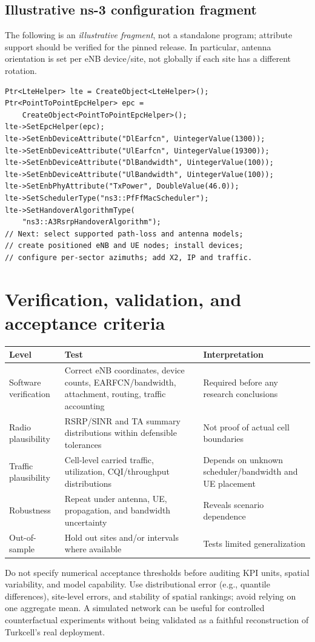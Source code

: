 \documentclass[11pt,a4paper]{article}
\begin{document}
\subsection{Illustrative ns-3 configuration fragment}
The following is an \emph{illustrative fragment}, not a standalone program; attribute support should be verified for the pinned release. In particular, antenna orientation is set per eNB device/site, not globally if each site has a different rotation.
\begin{lstlisting}[style=cpp]
Ptr<LteHelper> lte = CreateObject<LteHelper>();
Ptr<PointToPointEpcHelper> epc =
    CreateObject<PointToPointEpcHelper>();
lte->SetEpcHelper(epc);
lte->SetEnbDeviceAttribute("DlEarfcn", UintegerValue(1300));
lte->SetEnbDeviceAttribute("UlEarfcn", UintegerValue(19300));
lte->SetEnbDeviceAttribute("DlBandwidth", UintegerValue(100));
lte->SetEnbDeviceAttribute("UlBandwidth", UintegerValue(100));
lte->SetEnbPhyAttribute("TxPower", DoubleValue(46.0));
lte->SetSchedulerType("ns3::PfFfMacScheduler");
lte->SetHandoverAlgorithmType(
    "ns3::A3RsrpHandoverAlgorithm");
// Next: select supported path-loss and antenna models;
// create positioned eNB and UE nodes; install devices;
// configure per-sector azimuths; add X2, IP and traffic.
\end{lstlisting}

\section{Verification, validation, and acceptance criteria}
\begin{table}[ht]\centering\small
\begin{tabularx}{\linewidth}{@{}l X X@{}}\toprule
Level & Test & Interpretation \\
\midrule
Software verification & Correct eNB coordinates, device counts, EARFCN/bandwidth, attachment, routing, traffic accounting & Required before any research conclusions \\
Radio plausibility & RSRP/SINR and TA summary distributions within defensible tolerances & Not proof of actual cell boundaries \\
Traffic plausibility & Cell-level carried traffic, utilization, CQI/throughput distributions & Depends on unknown scheduler/bandwidth and UE placement \\
Robustness & Repeat under antenna, UE, propagation, and bandwidth uncertainty & Reveals scenario dependence \\
Out-of-sample & Hold out sites and/or intervals where available & Tests limited generalization \\
\bottomrule\end{tabularx}\end{table}
Do not specify numerical acceptance thresholds before auditing KPI units, spatial variability, and model capability. Use distributional error (e.g., quantile differences), site-level errors, and stability of spatial rankings; avoid relying on one aggregate mean. A simulated network can be useful for controlled counterfactual experiments without being validated as a faithful reconstruction of Turkcell's real deployment.
\end{document}
